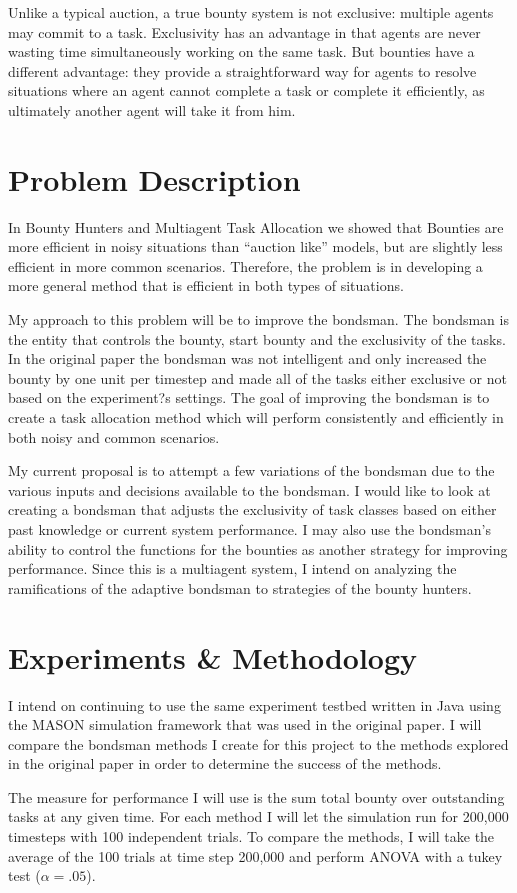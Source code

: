 \documentclass[twocolumn]{article}
\begin{document}
Unlike a typical auction, a true bounty system is not exclusive: multiple agents may commit to a task.  Exclusivity has an advantage in that agents are never wasting time simultaneously working on the same task.  But bounties have a different advantage: they provide a straightforward way for agents to resolve situations where an agent cannot complete a task or complete it efficiently, as  ultimately another agent will take it from him. 

\section{Problem Description}
In Bounty Hunters and Multiagent Task Allocation we showed that Bounties are more efficient in noisy situations than ``auction like'' models, but are slightly less efficient in more common scenarios.  Therefore, the problem is in developing a more general method that is efficient in both types of situations.  

My approach to this problem will be to improve the bondsman.  The bondsman is the entity that controls the bounty, start bounty and the exclusivity of the tasks.  In the original paper the bondsman was not intelligent and only increased the bounty by one unit per timestep and made all of the tasks either exclusive or not based on the experiment?s settings.  The goal of improving the bondsman is to create a task allocation method which will perform consistently and efficiently in both noisy and common scenarios.

My current proposal is to attempt a few variations of the bondsman due to the various inputs and decisions available to the bondsman.  I would like to look at creating a bondsman that adjusts the exclusivity of task classes based on either past knowledge or current system performance.  I may also use the bondsman's ability to control the functions for the bounties as another strategy for improving performance.  Since this is a multiagent system, I intend on analyzing the ramifications of the adaptive bondsman to strategies of the bounty hunters.

\section{Experiments \& Methodology}
I intend on continuing to use the same experiment testbed written in Java using the MASON simulation framework that was used in the original paper.  I will compare the bondsman methods I create for this project to the methods explored in the original paper in order to determine the success of the methods.

The measure for performance I will use is the sum total bounty over outstanding tasks at any given time.  For each method I will let the simulation run for 200,000 timesteps with 100 independent trials.  To compare the methods, I will take the average of the 100 trials at time step 200,000 and perform ANOVA with a tukey test (\(\alpha = .05\)).

\vspace{-0.5em}


\end{document}
